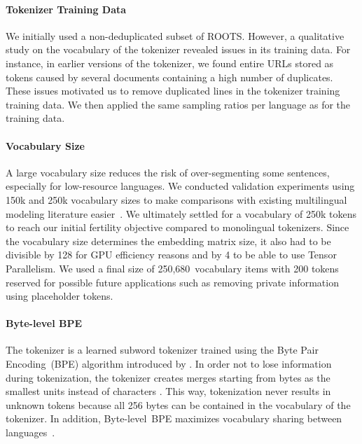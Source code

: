 \documentclass[twoside,11pt]{article}
\begin{document}
\paragraph{Tokenizer Training Data} We initially used a non-deduplicated subset of ROOTS. However, a qualitative study on the vocabulary of the tokenizer revealed issues in its training data. For instance, in earlier versions of the tokenizer, we found entire URLs stored as tokens caused by several documents containing a high number of duplicates. These issues motivated us to remove duplicated lines in the tokenizer training training data. We then applied the same sampling ratios per language as for the training data.

\paragraph{Vocabulary Size} 

%
A large vocabulary size reduces the risk of over-segmenting some sentences, especially for low-resource languages. We conducted validation experiments using 150k and 250k vocabulary sizes to make comparisons with existing multilingual modeling literature easier~\citep{conneau2020unsupervised,xue2021mt5}. We ultimately settled for a vocabulary of 250k tokens to reach our initial fertility objective compared to monolingual tokenizers. Since the vocabulary size determines the embedding matrix size, it also had to be divisible by 128 for GPU efficiency reasons and by 4 to be able to use Tensor Parallelism. We used a final size of 250,680~vocabulary items with 200 tokens reserved for possible future applications such as removing private information using placeholder tokens.

\paragraph{Byte-level BPE}
The tokenizer is a learned subword tokenizer trained using the Byte Pair Encoding~(BPE) algorithm introduced by \citet{gagebpe}. In order not to lose information during tokenization, the tokenizer creates merges starting from bytes as the smallest units instead of characters \citep{radford2019language}. This way, tokenization never results in unknown tokens because all 256 bytes can be contained in the vocabulary of the tokenizer. In addition, Byte-level~BPE maximizes vocabulary sharing between languages~\citep{wang2020neural}.
\end{document}
